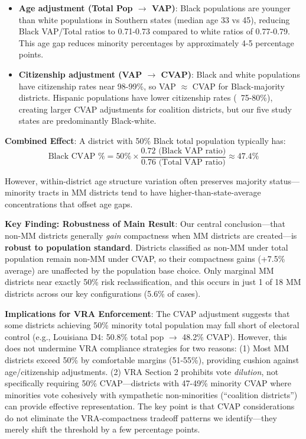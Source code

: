 \begin{itemize}
    \item \textbf{Age adjustment (Total Pop $\to$ VAP)}: Black populations are younger than white populations in Southern states (median age 33 vs 45), reducing Black VAP/Total ratios to 0.71-0.73 compared to white ratios of 0.77-0.79. This age gap reduces minority percentages by approximately 4-5 percentage points.

    \item \textbf{Citizenship adjustment (VAP $\to$ CVAP)}: Black and white populations have citizenship rates near 98-99\%, so VAP $\approx$ CVAP for Black-majority districts. Hispanic populations have lower citizenship rates (~75-80\%), creating larger CVAP adjustments for coalition districts, but our five study states are predominantly Black-white.
\end{itemize}

\textbf{Combined Effect}: A district with 50\% Black total population typically has:
\[
\text{Black CVAP \%} = 50\% \times \frac{0.72 \text{ (Black VAP ratio)}}{0.76 \text{ (Total VAP ratio)}} \approx 47.4\%
\]

However, within-district age structure variation often preserves majority status---minority tracts in MM districts tend to have higher-than-state-average concentrations that offset age gaps.



\textbf{Key Finding: Robustness of Main Result}: Our central conclusion---that non-MM districts generally \emph{gain} compactness when MM districts are created---is \textbf{robust to population standard}. Districts classified as non-MM under total population remain non-MM under CVAP, so their compactness gains (+7.5\% average) are unaffected by the population base choice. Only marginal MM districts near exactly 50\% risk reclassification, and this occurs in just 1 of 18 MM districts across our key configurations (5.6\% of cases).

\textbf{Implications for VRA Enforcement}: The CVAP adjustment suggests that some districts achieving 50\% minority total population may fall short of electoral control (e.g., Louisiana D4: 50.8\% total pop $\to$ 48.2\% CVAP). However, this does not undermine VRA compliance strategies for two reasons: (1) Most MM districts exceed 50\% by comfortable margins (51-55\%), providing cushion against age/citizenship adjustments. (2) VRA Section 2 prohibits vote \emph{dilution}, not specifically requiring 50\% CVAP---districts with 47-49\% minority CVAP where minorities vote cohesively with sympathetic non-minorities (``coalition districts'') can provide effective representation. The key point is that CVAP considerations do not eliminate the VRA-compactness tradeoff patterns we identify---they merely shift the threshold by a few percentage points.

